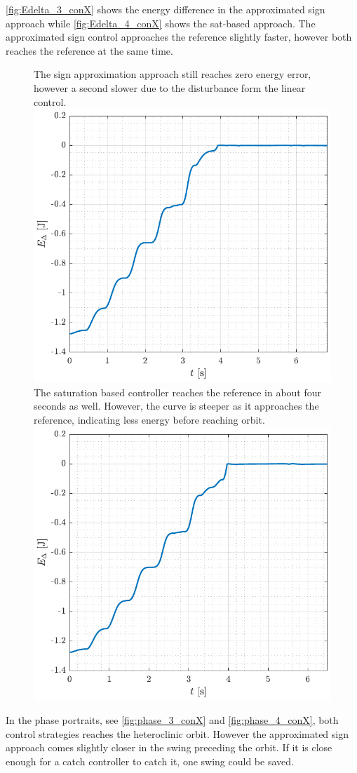 \autoref{fig:Edelta_3_conX} shows the energy difference in the approximated sign approach while \autoref{fig:Edelta_4_conX} shows the sat-based approach. The approximated sign control approaches the reference slightly faster, however both reaches the reference at the same time.
%
\begin{figure}[H]
  \hspace{-10pt}
  \captionbox
  {
    The sign approximation approach still reaches zero energy error, however a second slower due to the disturbance form the linear control.
    \label{fig:Edelta_3_conX}
  }
  {
    \hspace{-1cm}
    \includegraphics[width=.46\textwidth]{figures/Edelta_3_conX}
  }
  \hspace{20pt}
  \captionbox 
  {
    The saturation based controller reaches the reference in about four seconds as well. However, the curve is steeper as it approaches the reference, indicating less energy before reaching orbit.
    \label{fig:Edelta_4_conX}
  }
  {
    \hspace{-1cm}
    \includegraphics[width=.46\textwidth]{figures/Edelta_4_conX}
  }  
\end{figure}
%
In the phase portraits, see \autoref{fig:phase_3_conX} and \ref{fig:phase_4_conX}, both control strategies reaches the heteroclinic orbit. However the approximated sign approach comes slightly closer in the swing preceding the orbit. If it is close enough for a catch controller to catch it, one swing could be saved.
